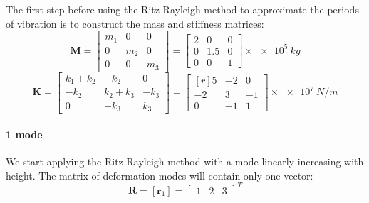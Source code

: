 \begin{Answer}[ref={three_storey_helicopter}]
The first step before using the Ritz-Rayleigh method to approximate the periods of vibration is to construct the mass and stiffness matrices:
$$
\mathbf{M} = \begin{bmatrix}
    m_1 & 0 & 0 \\
    0 & m_2 & 0 \\
    0 & 0 & m_3
\end{bmatrix}
= \begin{bmatrix}
    2 & 0 & 0 \\
    0 & 1.5 & 0 \\
    0 & 0 & 1
\end{bmatrix} \times \SI{e5}{kg}
$$
$$
\mathbf{K} = \begin{bmatrix}
    k_1+k_2 & -k_2 & 0 \\
    -k_2 & k_2+k_3 & -k_3 \\
    0 & -k_3 & k_3
\end{bmatrix}
= \begin{bmatrix*}[r]
    5 & -2 & 0 \\
    -2 & 3 & -1 \\
    0 & -1 & 1
\end{bmatrix*} \times \SI{e7}{N/m}
$$

\paragraph{1 mode} We start applying the Ritz-Rayleigh method with a mode linearly increasing with height. The matrix of deformation modes will contain only one vector:
$$
\mathbf{R} = [\mathbf{r}_1] =
\begin{bmatrix}
    1 & 2 & 3
\end{bmatrix}^T
$$


\end{Answer}
